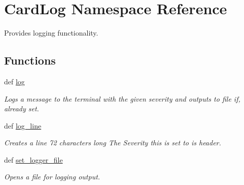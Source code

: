 \hypertarget{namespaceCardLog}{\section{Card\-Log Namespace Reference}
\label{namespaceCardLog}
}


Provides logging functionality.  


\subsection*{Functions}
\begin{DoxyCompactItemize}
\item 
def \hyperlink{namespaceCardLog_af485459b55c5afb10781afba22dd3e12}{log}
\begin{DoxyCompactList}\small\item\em Logs a message to the terminal with the given severity and outputs to file if, already set. \end{DoxyCompactList}\item 
\hypertarget{namespaceCardLog_ab83557e97e6ec27d91da6caaa203592f}{def \hyperlink{namespaceCardLog_ab83557e97e6ec27d91da6caaa203592f}{log\-\_\-line}}\label{namespaceCardLog_ab83557e97e6ec27d91da6caaa203592f}

\begin{DoxyCompactList}\small\item\em Creates a line 72 characters long The Severity this is set to is header. \end{DoxyCompactList}\item 
def \hyperlink{namespaceCardLog_ac8a14ec88b4fcd0f39b08895db47ef39}{set\-\_\-logger\-\_\-file}
\begin{DoxyCompactList}\small\item\em Opens a file for logging output. \end{DoxyCompactList}\end{DoxyCompactItemize}

